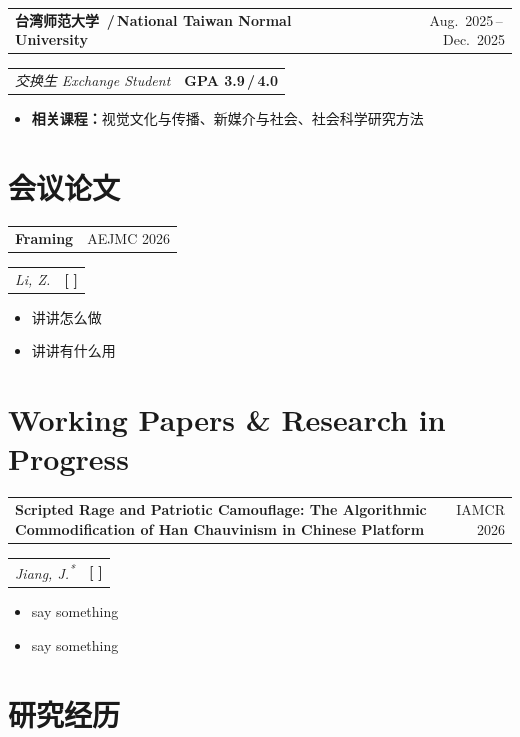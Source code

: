 \documentclass[a4paper,11pt]{article}
\makeatletter
\newcommand{\entryhead}[2]{%
  \par\vspace{6pt}
  \noindent\begin{tabularx}{\linewidth}{@{}X r@{}}
    {\large\bfseries\color{body}#1} & {\small\color{muted}\sffamily #2} \\
  \end{tabularx}\par\vspace{2pt}
}
\newcommand{\entrymeta}[2]{%
  \noindent\begin{tabularx}{\linewidth}{@{}X r@{}}
    {\normalsize\itshape\color{body} #1} & {\small\color{muted}\textbf{#2}} \\
  \end{tabularx}\par\vspace{4pt}
}
\makeatother
\begin{document}
\entryhead{台湾师范大学 \normalfont\textcolor{muted}{\,/\,National Taiwan Normal University}}{Aug.\ 2025\,--\,Dec.\ 2025}
\entrymeta{交换生\,\,Exchange Student}{GPA \textbf{3.9}\,/\,4.0}
\begin{itemize}
  \item \textbf{相关课程：}视觉文化与传播、新媒介与社会、社会科学研究方法
\end{itemize}

\section{会议论文}

\entryhead{Framing}{AEJMC 2026}
\entrymeta{Li, Z.}{[\,\href{https://some-link.com}{\faGlobe}\,]}
\begin{itemize}
  \item 讲讲怎么做
  \item 讲讲有什么用
\end{itemize}

\section{Working Papers \& Research in Progress}

\entryhead{Scripted Rage and Patriotic Camouflage: The Algorithmic Commodification of Han Chauvinism in Chinese Platform}{IAMCR 2026}
\entrymeta{Jiang, J.\textsuperscript{*}}{[\,\href{https://some-link.com}{\faGlobe}\,]}
\begin{itemize}
  \item say something
  \item say something
\end{itemize}

\section{研究经历}
\end{document}

